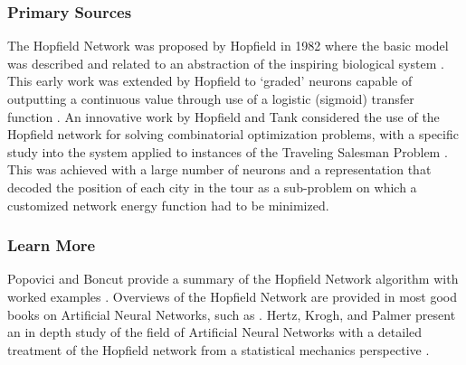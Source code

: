 % 
% 
\subsubsection{Primary Sources}
The Hopfield Network was proposed by Hopfield in 1982 where the basic model was described and related to an abstraction of the inspiring biological system \cite{Hopfield1982}.
This early work was extended by Hopfield to `graded' neurons capable of outputting a continuous value through use of a logistic (sigmoid) transfer function \cite{Hopfield1984}.
An innovative work by Hopfield and Tank considered the use of the Hopfield network for solving combinatorial optimization problems, with a specific study into the system applied to instances of the Traveling Salesman Problem \cite{Hopfield1985}. This was achieved with a large number of neurons and a representation that decoded the position of each city in the tour as a sub-problem on which a customized network energy function had to be minimized.

% 
% 
\subsubsection{Learn More}
Popovici and Boncut provide a summary of the Hopfield Network algorithm with worked examples \cite{Popovici2005}.
Overviews of the Hopfield Network are provided in most good books on Artificial Neural Networks, such as \cite{Rojas1996}.
Hertz, Krogh, and Palmer present an in depth study of the field of Artificial Neural Networks with a detailed treatment of the Hopfield network from a statistical mechanics perspective \cite{Hertz1991}.


